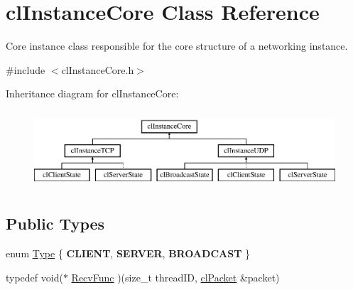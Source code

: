 \hypertarget{classcl_instance_core}{
\section{clInstanceCore Class Reference}
\label{classcl_instance_core}
}


Core instance class responsible for the core structure of a networking instance.  




{\ttfamily \#include $<$clInstanceCore.h$>$}

Inheritance diagram for clInstanceCore:\begin{figure}[H]
\begin{center}
\leavevmode
\includegraphics[height=2.921739cm]{classcl_instance_core}
\end{center}
\end{figure}
\subsection*{Public Types}
\begin{DoxyCompactItemize}
\item 
enum \hyperlink{classcl_instance_core_a576bdbf2ccec2df9cb2aab1edfe9dd2e}{Type} \{ {\bfseries CLIENT}, 
{\bfseries SERVER}, 
{\bfseries BROADCAST}
 \}
\item 
typedef void($\ast$ \hyperlink{classcl_instance_core_afa96c2a2c0b26b6a9256b87798bf9587}{RecvFunc} )(size\_\-t threadID, \hyperlink{classcl_packet}{clPacket} \&packet)
\end{DoxyCompactItemize}
